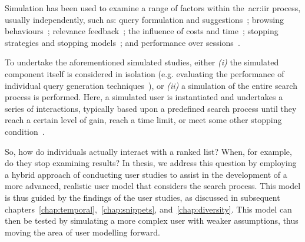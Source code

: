 Simulation has been used to examine a range of factors within the~\gls{acr:iir} process, usually independently, such as: query formulation and suggestions~\citep{azzopardi2009query_side, azzopardi2007languages, baskaya2013behavioural_factors, carterette2015test_collections, jordan2006cqg, keskustalo2008user_simulation, verberne2015personalised_queries}; browsing behaviours~\citep{carterette2015test_collections, chuklin2015click_models, guo2009click_chain, pakkonen2015behavioural_dimensions, smucker2011user_strategies}; relevance feedback~\citep{harman1992rf, jarvelin2009graded_relevance, keskustalo2006rf, keskustalo2008user_simulation, ruthven2003interactive_query_expansion}; the influence of costs and time~\cite{azzopardi2011economics, baskaya2012simulating_sessions}; stopping strategies and stopping models~\cite{carterette2011effectiveness_evaluation, carterette2015test_collections, maxwell2015initial_stopping, maxwell2015stopping_strategies, thomas2014modelling_behaviour}; and performance over sessions~\citep{luo2014winwin,luo2015pomdp}.

To undertake the aforementioned simulated studies, either \emph{(i)} the simulated component itself is considered in isolation (e.g. evaluating the performance of individual query generation techniques~\citep{azzopardi2007languages, jordan2006cqg}), or \emph{(ii)} a simulation of the entire search process is performed. Here, a simulated user is instantiated and undertakes a series of interactions, typically based upon a predefined search process until they reach a certain level of gain, reach a time limit, or meet some other stopping condition~\citep{baskaya2013behavioural_factors, maxwell2015initial_stopping, maxwell2015stopping_strategies, moffat2013users_versus_models, thomas2014modelling_behaviour}.

So, how do individuals actually interact with a ranked list? When, for example, do they stop examining results? In thesis, we address this question by employing a hybrid approach of conducting user studies to assist in the development of a more advanced, realistic user model that considers the search process. This model is thus guided by the findings of the user studies, as discussed in subsequent chapters~\ref{chap:temporal},~\ref{chap:snippets}, and~\ref{chap:diversity}. This model can then be tested by simulating a more complex user with weaker assumptions, thus moving the area of user modelling forward.


